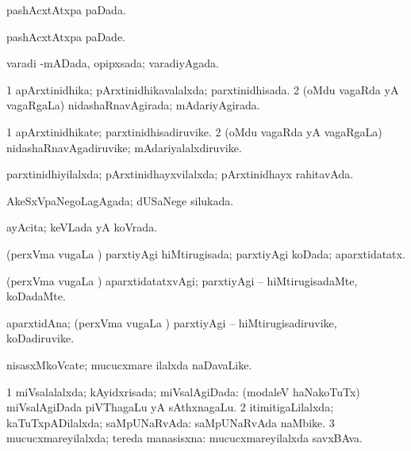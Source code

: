 \bentry
{} 
\gl{\gu}
\expl{}
\bmng
pashAcxtAtxpa paDada. 
\emng
\eentry

\bentry
{} 
\gl{\kirxvi}
\expl{}
\bmng
pashAcxtAtxpa paDade. 
\emng
\eentry

\bentry
{} 
\gl{\gu}
\expl{}
\bmng
varadi -mADada, opipxsada; varadiyAgada. 
\emng
\eentry

\bentry
{} 
\gl{\gu}
\expl{}
\bmng
\bnum
\num{1} apArxtinidhika; pArxtinidhikavalalxda; parxtinidhisada. 
\num{2} (oMdu vagaRda yA vagaRgaLa) nidashaRnavAgirada; mAdariyAgirada. 
\enum
\emng
\eentry

\bentry
{} 
\gl{\nA}
\expl{}
\bmng
\bnum
\num{1} apArxtinidhikate; parxtinidhisadiruvike. 
\num{2} (oMdu vagaRda yA vagaRgaLa) nidashaRnavAgadiruvike; mAdariyalalxdiruvike. 
\enum
\emng
\eentry

\bentry
{} 
\gl{\gu}
\expl{}
\bmng
parxtinidhiyilalxda; pArxtinidhayxvilalxda; pArxtinidhayx rahitavAda. 
\emng
\eentry

\bentry
{} 
\gl{\gu}
\expl{}
\bmng
AkeSxVpaNegoLagAgada; dUSaNege silukada. 
\emng
\eentry

\bentry
{} 
\gl{\gu}
\expl{}
\bmng
ayAcita; keVLada yA koVrada. 
\emng
\eentry

\bentry
{} 
\gl{\gu}
\expl{}
\bmng
(perxVma \mo vugaLa \vi) parxtiyAgi hiMtirugisada; parxtiyAgi koDada; aparxtidatatx. 
\emng
\eentry

\bentry
{} 
\gl{\kirxvi}
\expl{}
\bmng
(perxVma \mo vugaLa \vi) aparxtidatatxvAgi; parxtiyAgi -- hiMtirugisadaMte, koDadaMte. 
\emng
\eentry

\bentry
{} 
\gl{\nA}
\expl{}
\bmng
aparxtidAna; (perxVma \mo vugaLa \vi) parxtiyAgi -- hiMtirugisadiruvike, koDadiruvike. 
\emng
\eentry

\bentry
{} 
\gl{\nA}
\expl{}
\bmng
nisasxMkoVcate; mucucxmare ilalxda naDavaLike. 
\emng
\eentry

\bentry
{} 
\gl{\gu}
\expl{}
\bmng
\bnum
\num{1} miVsalalalxda; kAyidxrisada; miVsalAgiDada:  (modaleV haNakoTuTx) miVsalAgiDada piVThagaLu yA sAthxnagaLu. 
\num{2} itimitigaLilalxda; kaTuTxpADilalxda; saMpUNaRvAda:  saMpUNaRvAda naMbike. 
\num{3} mucucxmareyilalxda; tereda manasisxna:  mucucxmareyilalxda savxBAva. 
\enum
\emng
\eentry

